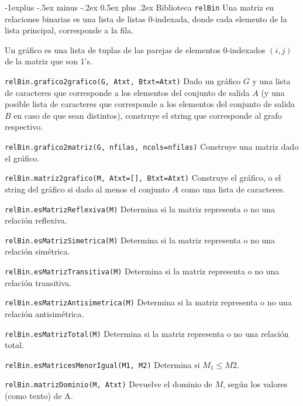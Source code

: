 \documentclass[10pt,landscape]{article}
\makeatletter
\renewcommand{\subsection}{\@startsection{subsection}{2}{0mm}%
                                {-1explus -.5ex minus -.2ex}%
                                {0.5ex plus .2ex}%
                                {\normalfont\normalsize\bfseries}}
\makeatother
\begin{document}
\begin{multicols}{3}
\subsection{Biblioteca \texttt{relBin}}
Una matriz en relaciones binarias es una lista de listas 0-indexada, donde cada elemento de la lista principal, corresponde a la fila.

Un gr\'afico es una lista de tuplas de las parejas de elementos 0-indexados $(i,j)$ de la matriz que son 1's.

\begin{asparaitem}
\item \verb|relBin.grafico2grafico(G, Atxt, Btxt=Atxt)|
  Dado un gr\'afico $G$ y una lista de caracteres que corresponde a los elementos del conjunto de salida $A$ (y una posible lista de caracteres que corresponde a los elementos del conjunto de salida $B$ en caso de que sean distintos), construye el string que corresponde al grafo respectivo.

\item \verb|relBin.grafico2matriz(G, nfilas, ncols=nfilas)|
  Construye una matriz dado el gr\'afico.

\item \verb|relBin.matriz2grafico(M, Atxt=[], Btxt=Atxt)|
  Construye el gr\'afico, o el string del gr\'afico si dado al menos el conjunto $A$ como una lista de caracteres.

\item \verb|relBin.esMatrizReflexiva(M)|
  Determina si la matriz representa o no una relaci\'on reflexiva.

\item \verb|relBin.esMatrizSimetrica(M)|
  Determina si la matriz representa o no una relaci\'on sim\'etrica.

\item \verb|relBin.esMatrizTransitiva(M)|
  Determina si la matriz representa o no una relaci\'on transitiva.

\item \verb|relBin.esMatrizAntisimetrica(M)|
  Determina si la matriz representa o no una relaci\'on antisim\'etrica.

\item \verb|relBin.esMatrizTotal(M)|
  Determina si la matriz representa o no una relaci\'on total.

\item \verb|relBin.esMatricesMenorIgual(M1, M2)|
  Determina si $M_1 \leq M2$.

\item \verb|relBin.matrizDominio(M, Atxt)| 
  Devuelve el dominio de $M$, seg\'un los valores (como texto) de A.


\end{asparaitem}
\end{multicols}
\end{document}
